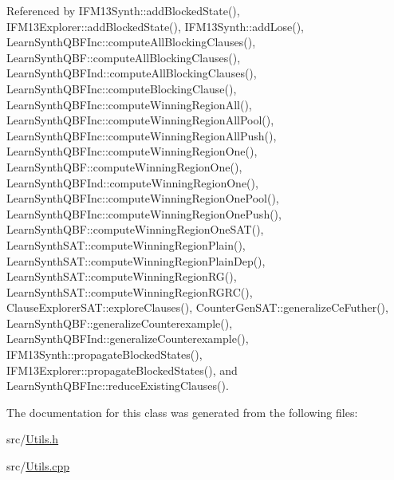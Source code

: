 Referenced by I\-F\-M13\-Synth\-::add\-Blocked\-State(), I\-F\-M13\-Explorer\-::add\-Blocked\-State(), I\-F\-M13\-Synth\-::add\-Lose(), Learn\-Synth\-Q\-B\-F\-Inc\-::compute\-All\-Blocking\-Clauses(), Learn\-Synth\-Q\-B\-F\-::compute\-All\-Blocking\-Clauses(), Learn\-Synth\-Q\-B\-F\-Ind\-::compute\-All\-Blocking\-Clauses(), Learn\-Synth\-Q\-B\-F\-Inc\-::compute\-Blocking\-Clause(), Learn\-Synth\-Q\-B\-F\-Inc\-::compute\-Winning\-Region\-All(), Learn\-Synth\-Q\-B\-F\-Inc\-::compute\-Winning\-Region\-All\-Pool(), Learn\-Synth\-Q\-B\-F\-Inc\-::compute\-Winning\-Region\-All\-Push(), Learn\-Synth\-Q\-B\-F\-Inc\-::compute\-Winning\-Region\-One(), Learn\-Synth\-Q\-B\-F\-::compute\-Winning\-Region\-One(), Learn\-Synth\-Q\-B\-F\-Ind\-::compute\-Winning\-Region\-One(), Learn\-Synth\-Q\-B\-F\-Inc\-::compute\-Winning\-Region\-One\-Pool(), Learn\-Synth\-Q\-B\-F\-Inc\-::compute\-Winning\-Region\-One\-Push(), Learn\-Synth\-Q\-B\-F\-::compute\-Winning\-Region\-One\-S\-A\-T(), Learn\-Synth\-S\-A\-T\-::compute\-Winning\-Region\-Plain(), Learn\-Synth\-S\-A\-T\-::compute\-Winning\-Region\-Plain\-Dep(), Learn\-Synth\-S\-A\-T\-::compute\-Winning\-Region\-R\-G(), Learn\-Synth\-S\-A\-T\-::compute\-Winning\-Region\-R\-G\-R\-C(), Clause\-Explorer\-S\-A\-T\-::explore\-Clauses(), Counter\-Gen\-S\-A\-T\-::generalize\-Ce\-Futher(), Learn\-Synth\-Q\-B\-F\-::generalize\-Counterexample(), Learn\-Synth\-Q\-B\-F\-Ind\-::generalize\-Counterexample(), I\-F\-M13\-Synth\-::propagate\-Blocked\-States(), I\-F\-M13\-Explorer\-::propagate\-Blocked\-States(), and Learn\-Synth\-Q\-B\-F\-Inc\-::reduce\-Existing\-Clauses().



The documentation for this class was generated from the following files\-:\begin{DoxyCompactItemize}
\item 
src/\hyperlink{Utils_8h}{Utils.\-h}\item 
src/\hyperlink{Utils_8cpp}{Utils.\-cpp}\end{DoxyCompactItemize}
